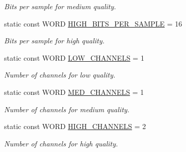 \begin{DoxyCompactItemize}
\begin{DoxyCompactList}\small\item\em Bits per sample for medium quality. \item\end{DoxyCompactList}\item 
\hypertarget{class_sound_format_a8636cf529abffbcec2d2225ebd0fd168}{
static const WORD \hyperlink{class_sound_format_a8636cf529abffbcec2d2225ebd0fd168}{HIGH\_\-BITS\_\-PER\_\-SAMPLE} = 16}
\label{class_sound_format_a8636cf529abffbcec2d2225ebd0fd168}

\begin{DoxyCompactList}\small\item\em Bits per sample for high quality. \item\end{DoxyCompactList}\item 
\hypertarget{class_sound_format_a378d26a25d7ce8ac8c15e2ff4ba1a38a}{
static const WORD \hyperlink{class_sound_format_a378d26a25d7ce8ac8c15e2ff4ba1a38a}{LOW\_\-CHANNELS} = 1}
\label{class_sound_format_a378d26a25d7ce8ac8c15e2ff4ba1a38a}

\begin{DoxyCompactList}\small\item\em Number of channels for low quality. \item\end{DoxyCompactList}\item 
\hypertarget{class_sound_format_aac4f90a611cf4b4a54b5996c006e0828}{
static const WORD \hyperlink{class_sound_format_aac4f90a611cf4b4a54b5996c006e0828}{MED\_\-CHANNELS} = 1}
\label{class_sound_format_aac4f90a611cf4b4a54b5996c006e0828}

\begin{DoxyCompactList}\small\item\em Number of channels for medium quality. \item\end{DoxyCompactList}\item 
\hypertarget{class_sound_format_ae6e169cc7c4e4718cf87d1a6bb4c5941}{
static const WORD \hyperlink{class_sound_format_ae6e169cc7c4e4718cf87d1a6bb4c5941}{HIGH\_\-CHANNELS} = 2}
\label{class_sound_format_ae6e169cc7c4e4718cf87d1a6bb4c5941}

\begin{DoxyCompactList}\small\item\em Number of channels for high quality. \item\end{DoxyCompactList}\end{DoxyCompactItemize}
